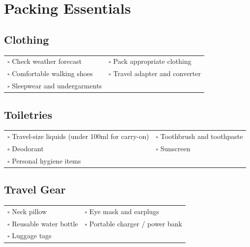 
\section{Packing Essentials}
\label{sec:packing}

\subsection{Clothing}

\begin{tabular}{p{9cm} p{8cm}}
$\square$ Check weather forecast & $\square$ Pack appropriate clothing \\ 
$\square$ Comfortable walking shoes & $\square$ Travel adapter and converter \\ 
$\square$ Sleepwear and undergarments & \\ 
\end{tabular}

\subsection{Toiletries}

\begin{tabular}{p{9cm} p{8cm}}
$\square$ Travel-size liquids (under 100ml for carry-on) & $\square$ Toothbrush and toothpaste \\ 
$\square$ Deodorant & $\square$ Sunscreen \\ 
$\square$ Personal hygiene items & \\ 
\end{tabular}

\subsection{Travel Gear}

\begin{tabular}{p{9cm} p{8cm}}
$\square$ Neck pillow & $\square$ Eye mask and earplugs \\ 
$\square$ Reusable water bottle & $\square$ Portable charger / power bank \\ 
$\square$ Luggage tags & \\ 
\end{tabular}


